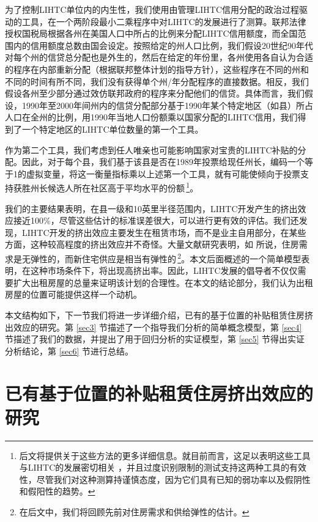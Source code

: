 \documentclass[lang=cn,11pt,a4paper]{paper}
\begin{document}
为了控制LIHTC单位内的内生性，我们使用由管理LIHTC信用分配的政治过程驱动的工具，在一个两阶段最小二乘程序中对LIHTC的发展进行了测算。联邦法律授权国税局根据各州在美国人口中所占的比例来分配LIHTC信用额度，而全国范围内的信用额度总数由国会设定。按照给定的州人口比例，我们假设20世纪90年代对每个州的信贷总分配也是外生的，然后在给定的年份里，各州使用各自认为合适的程序在内部重新分配（根据联邦整体计划的指导方针），这些程序在不同的州和不同的时间有所不同，我们没有获得单个州/年分配程序的直接数据。相反，我们假设各州至少部分通过效仿联邦政府的程序来分配他们的信贷。具体而言，我们假设，1990年至2000年间州内的信贷分配部分基于1990年某个特定地区（如县）所占人口在全州的比例，用1990年当地人口份额乘以国家分配的LIHTC信用，我们得到了一个特定地区的LIHTC单位数量的第一个工具。

作为第二个工具，我们考虑到任人唯亲也可能影响国家对宝贵的LIHTC补贴的分配。因此，对于每个县，我们基于该县是否在1989年投票给现任州长，编码一个等于1的虚拟变量，将这一衡量指标乘以上述第一个工具，就有可能使倾向于投票支持获胜州长候选人所在社区高于平均水平的份额\,\footnote{后文将提供关于这些方法的更多详细信息。就目前而言，这足以表明这些工具与LIHTC的发展密切相关 \citep{Stock200580,Murray2006111}，并且过度识别限制的测试支持这两种工具的有效性，尽管我们对这种测算持谨慎态度，因为它们具有已知的弱功率以及假阴性和假阳性的趋势。}。

我们的主要结果表明，在县一级和10英里半径范围内，LIHTC开发产生的挤出效应接近100\%，尽管这些估计的标准误差很大，可以进行更有效的评估。我们还发现，LIHTC开发的挤出效应主要发生在租赁市场，而不是业主自用部分，在某些方面，这种较高程度的挤出效应并不奇怪。大量文献研究表明，如 \cite{Hanushek1980449} 所说，住房需求是无弹性的，而新住宅供应是相当有弹性的\,\footnote{在后文中，我们将回顾先前对住房需求和供给弹性的估计。}。本文后面概述的一个简单模型表明，在这种市场条件下，将出现高挤出率。因此，LIHTC发展的倡导者不仅仅需要扩大出租房屋的总量来证明该计划的合理性。在本文的结论部分，我们认为出租房屋的位置可能提供这样一个动机。

本文结构如下，下一节我们将进一步详细介绍，已有的基于位置的补贴租赁住房挤出效应的研究。第 \ref{sec3} 节描述了一个指导我们分析的简单概念模型，第 \ref{sec4} 节描述了我们的数据，并提出了用于回归分析的实证模型，第 \ref{sec5} 节得出实证分析结论，第 \ref{sec6} 节进行总结。

\section{已有基于位置的补贴租赁住房挤出效应的研究}
\end{document}
